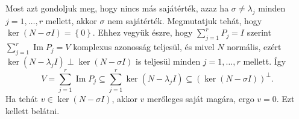 \documentclass[a4paper, showtrims]{memoir}
\makeatletter
\renewenvironment{proof}[1][\proofname]
    {\par\pushQED{\qed}%
    \normalfont \topsep6\p@\@plus6\p@\relax
    \trivlist
    \item[\hskip\labelsep
        \itshape
    #1\@addpunct{:}]\ignorespaces}
    {\popQED\endtrivlist\@endpefalse}
\theoremstyle{plain}
\theoremstyle{remark}
\theoremstyle{definition}
\DeclareMathOperator{\im}{Im}
\makeatother
\begin{document}
\begin{proof}
	Most azt gondoljuk meg, hogy nincs más sajátérték, azaz ha $\sigma\neq \lambda_j$ minden $j=1,\dots,r$ mellett,
    akkor $\sigma$ nem sajátérték.
    Megmutatjuk tehát, hogy $\ker\left( N-\sigma I \right)=\left\{ 0 \right\}$.
    Ehhez vegyük észre, hogy $\sum_{j=1}^rP_j=I$ szerint $\sum_{j=1}^r\im P_j=V$ komplexus azonosság teljesül,
    és mivel $N$ normális, ezért $\ker\left( N-\lambda_jI \right)\perp\ker\left( N-\sigma I \right)$ is teljesül
    minden $j=1,\dots,r$ mellett.
    Így
    \[
        V=\sum_{j=1}^r\im P_j\subseteq\sum_{j=1}^r\ker\left( N-\lambda_jI \right)\subseteq\left( \ker\left( N-\sigma I \right) \right)^\perp.
    \]
    Ha tehát $v\in\ker\left( N-\sigma I \right)$, akkor $v$ merőleges saját magára, ergo $v=0$.
    Ezt kellett belátni. 
\end{proof}
\end{document}
